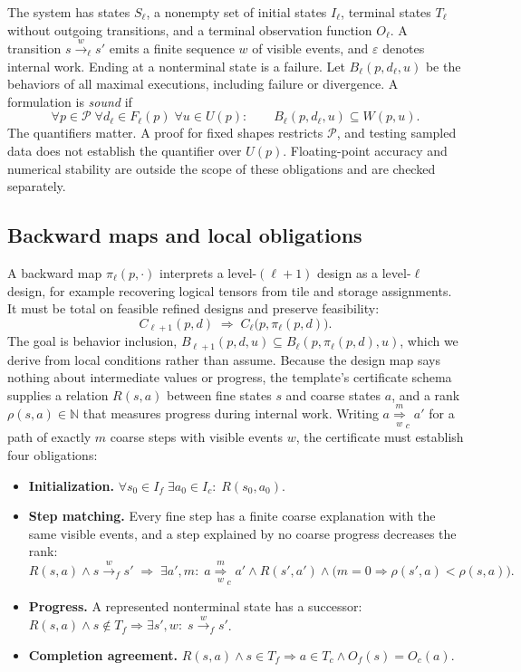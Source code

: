 \documentclass[11pt]{article}
\providecommand{\tightlist}{\setlength{\itemsep}{0pt}\setlength{\parskip}{0pt}}
\begin{document}
The system has states \(S_\ell\), a nonempty set of initial states \(I_\ell\), terminal states \(T_\ell\) without outgoing transitions, and a terminal observation function \(O_\ell\). A transition \(s\xrightarrow{w}_\ell s'\) emits a finite sequence \(w\) of visible events, and \(\varepsilon\) denotes internal work. Ending at a nonterminal state is a failure. Let \(B_\ell(p,d_\ell,u)\) be the behaviors of all maximal executions, including failure or divergence. A formulation is \emph{sound} if
\[
\forall p\in\mathcal P\;\forall d_\ell\in F_\ell(p)\;\forall u\in U(p):\qquad B_\ell(p,d_\ell,u)\subseteq W(p,u).
\]
The quantifiers matter. A proof for fixed shapes restricts \(\mathcal P\), and testing sampled data does not establish the quantifier over \(U(p)\). Floating-point accuracy and numerical stability are outside the scope of these obligations and are checked separately.

\hypertarget{backward-maps-and-local-obligations}{%
\subsection{Backward maps and local obligations}\label{backward-maps-and-local-obligations}}

A backward map \(\pi_\ell(p,\cdot)\) interprets a level-\((\ell+1)\) design as a level-\(\ell\) design, for example recovering logical tensors from tile and storage assignments. It must be total on feasible refined designs and preserve feasibility:
\[
C_{\ell+1}(p,d)\;\Longrightarrow\;C_\ell\bigl(p,\pi_\ell(p,d)\bigr).
\]
The goal is behavior inclusion, \(B_{\ell+1}(p,d,u)\subseteq B_\ell(p,\pi_\ell(p,d),u)\), which we derive from local conditions rather than assume. Because the design map says nothing about intermediate values or progress, the template's certificate schema supplies a relation \(R(s,a)\) between fine states \(s\) and coarse states \(a\), and a rank \(\rho(s,a)\in\mathbb N\) that measures progress during internal work. Writing \(a\overset{m}{\underset{w}{\Rightarrow}}_c a'\) for a path of exactly \(m\) coarse steps with visible events \(w\), the certificate must establish four obligations:

\begin{itemize}
\tightlist
\item
  \textbf{Initialization.} \(\forall s_0\in I_f\;\exists a_0\in I_c:\;R(s_0,a_0)\).
\item
  \textbf{Step matching.} Every fine step has a finite coarse explanation with the same visible events, and a step explained by no coarse progress decreases the rank:
  \[R(s,a)\land s\xrightarrow{w}_f s'\;\Longrightarrow\;\exists a',m:\;a\overset{m}{\underset{w}{\Rightarrow}}_c a'\land R(s',a')\land\bigl(m=0\Rightarrow\rho(s',a)<\rho(s,a)\bigr).\]
\item
  \textbf{Progress.} A represented nonterminal state has a successor: \(R(s,a)\land s\notin T_f\Rightarrow\exists s',w:\;s\xrightarrow{w}_f s'\).
\item
  \textbf{Completion agreement.} \(R(s,a)\land s\in T_f\Rightarrow a\in T_c\land O_f(s)=O_c(a)\).
\end{itemize}
\end{document}
